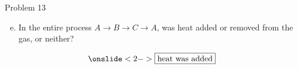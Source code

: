 \documentclass[aspectratio=169]{beamer}
\begin{document}
	\begin{frame}{Problem 13}
		\begin{enumerate}[a)]
			\setcounter{enumi}{4}
			\item In the entire process \(A \to B \to C \to A\), was heat added or removed from the gas, or neither?
		\end{enumerate}
		
		\begin{equation*}
			\onslide<2->\boxed{\text{heat was added}}
		\end{equation*}
	\end{frame}
\end{document}
